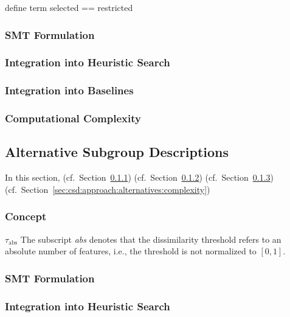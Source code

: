 \documentclass{article}
\theoremstyle{definition}
\begin{document}
define term selected == restricted

\subsubsection{SMT Formulation}
\label{sec:csd:approach:cardinality:smt}

\subsubsection{Integration into Heuristic Search}
\label{sec:csd:approach:cardinality:heuristics}

\subsubsection{Integration into Baselines}
\label{sec:csd:approach:cardinality:baselines}

\subsubsection{Computational Complexity}
\label{sec:csd:approach:cardinality:complexity}

\subsection{Alternative Subgroup Descriptions}
\label{sec:csd:approach:alternatives}

In this section, (cf.~Section~\ref{sec:csd:approach:alternatives:concept}) (cf.~Section~\ref{sec:csd:approach:alternatives:smt}) (cf.~Section~\ref{sec:csd:approach:alternatives:heuristics}) (cf.~Section~\ref{sec:csd:approach:alternatives:complexity})

\subsubsection{Concept}
\label{sec:csd:approach:alternatives:concept}

$\tau_{\text{abs}}$
The subscript \emph{abs} denotes that the dissimilarity threshold refers to an absolute number of features, i.e., the threshold is not normalized to $[0,1]$.

\subsubsection{SMT Formulation}
\label{sec:csd:approach:alternatives:smt}

\subsubsection{Integration into Heuristic Search}
\label{sec:csd:approach:alternatives:heuristics}
\end{document}
